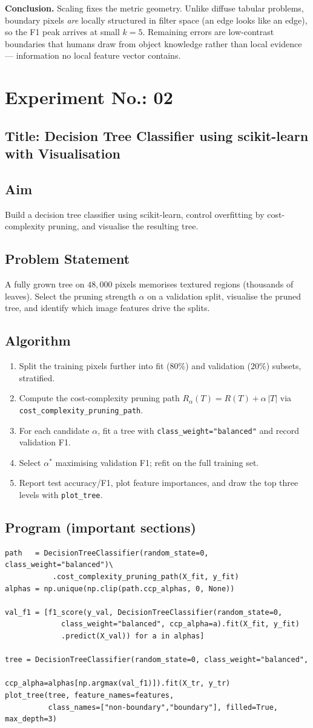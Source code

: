 \documentclass[11pt,a4paper]{article}
\newcommand{\labsection}[1]{\subsection*{#1}}
\begin{document}
\textbf{Conclusion.} Scaling fixes the metric geometry. Unlike diffuse tabular problems, boundary pixels \emph{are} locally structured in filter space (an edge looks like an edge), so the F1 peak arrives at small $k=5$. Remaining errors are low-contrast boundaries that humans draw from object knowledge rather than local evidence --- information no local feature vector contains.

\newpage
\section*{Experiment No.: 02}
\labsection{Title: Decision Tree Classifier using scikit-learn with Visualisation}

\labsection{Aim}
Build a decision tree classifier using scikit-learn, control overfitting by cost-complexity pruning, and visualise the resulting tree.

\labsection{Problem Statement}
A fully grown tree on $48{,}000$ pixels memorises textured regions (thousands of leaves). Select the pruning strength $\alpha$ on a validation split, visualise the pruned tree, and identify which image features drive the splits.

\labsection{Algorithm}
\begin{enumerate}[nosep]
  \item Split the training pixels further into fit ($80\%$) and validation ($20\%$) subsets, stratified.
  \item Compute the cost-complexity pruning path $R_\alpha(T)=R(T)+\alpha\,|T|$ via \texttt{cost\_complexity\_pruning\_path}.
  \item For each candidate $\alpha$, fit a tree with \texttt{class\_weight="balanced"} and record validation F1.
  \item Select $\alpha^*$ maximising validation F1; refit on the full training set.
  \item Report test accuracy/F1, plot feature importances, and draw the top three levels with \texttt{plot\_tree}.
\end{enumerate}

\labsection{Program (important sections)}
\begin{lstlisting}
path   = DecisionTreeClassifier(random_state=0, class_weight="balanced")\
           .cost_complexity_pruning_path(X_fit, y_fit)
alphas = np.unique(np.clip(path.ccp_alphas, 0, None))

val_f1 = [f1_score(y_val, DecisionTreeClassifier(random_state=0,
             class_weight="balanced", ccp_alpha=a).fit(X_fit, y_fit)
             .predict(X_val)) for a in alphas]

tree = DecisionTreeClassifier(random_state=0, class_weight="balanced",
                              ccp_alpha=alphas[np.argmax(val_f1)]).fit(X_tr, y_tr)
plot_tree(tree, feature_names=features,
          class_names=["non-boundary","boundary"], filled=True, max_depth=3)
\end{lstlisting}
\end{document}
